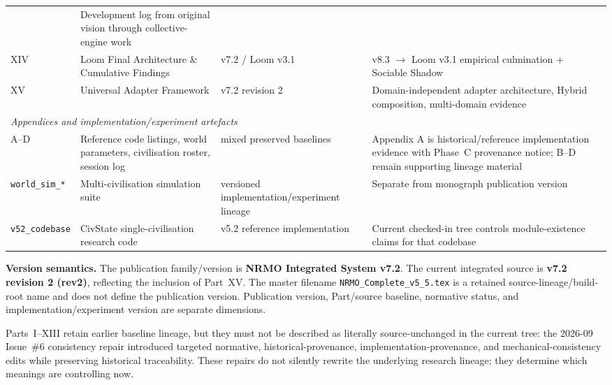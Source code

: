 \begin{center}
\begin{tabular}{p{} p{} p{} p{}}
    & Development log from original vision through collective-engine work \\
XIV & Loom Final Architecture \& Cumulative Findings
    & v7.2 / Loom v3.1
    & v8.3 $\rightarrow$ Loom v3.1 empirical culmination + Sociable Shadow \\
XV  & Universal Adapter Framework
    & v7.2 revision 2
    & Domain-independent adapter architecture, Hybrid composition, multi-domain evidence \\
\midrule
\multicolumn{4}{l}{\itshape Appendices and implementation/experiment artefacts} \\
A--D & Reference code listings, world parameters, civilisation roster, session log
    & mixed preserved baselines
    & Appendix A is historical/reference implementation evidence with Phase~C provenance notice; B--D remain supporting lineage material \\
\texttt{world\_sim\_*}
    & Multi-civilisation simulation suite
    & versioned implementation/experiment lineage
    & Separate from monograph publication version \\
\texttt{v52\_codebase}
    & CivState single-civilisation research code
    & v5.2 reference implementation
    & Current checked-in tree controls module-existence claims for that codebase \\
\bottomrule
\end{tabular}
\end{center}

\vspace{0.5em}

\noindent
\textbf{Version semantics.}
The publication family/version is \textbf{NRMO Integrated System v7.2}.
The current integrated source is \textbf{v7.2 revision 2 (rev2)}, reflecting
the inclusion of Part~XV. The master filename
\texttt{NRMO\_Complete\_v5\_5.tex} is a retained source-lineage/build-root
name and does not define the publication version. Publication version,
Part/source baseline, normative status, and implementation/experiment
version are separate dimensions.

\noindent
Parts~I--XIII retain earlier baseline lineage, but they must not be described
as literally source-unchanged in the current tree: the 2026-09 Issue~\#6
consistency repair introduced targeted normative, historical-provenance,
implementation-provenance, and mechanical-consistency edits while preserving
historical traceability. These repairs do not silently rewrite the underlying
research lineage; they determine which meanings are controlling now.

